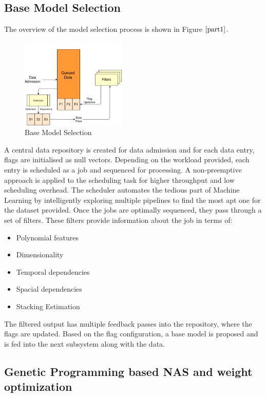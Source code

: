 \documentclass[conference]{IEEEtran}
\begin{document}
\subsection{\textbf{Base Model Selection}}
The overview of the model selection process is shown in Figure $\ref{part1}$.
\begin{figure}[!b]
\centerline{\includegraphics[width=50mm]{part1.png}}
\caption{Base Model Selection}
\label{part1}
\end{figure}

A central data repository is created for data admission and for each data entry, flags are initialised as null vectors. Depending on the workload provided, each entry is scheduled as a job and sequenced for processing. A non-preemptive approach is applied to the scheduling task for higher throughput and low scheduling overhead. The scheduler automates the tedious part of Machine Learning by intelligently exploring multiple pipelines to find the most apt one for the dataset provided. Once the jobs are optimally sequenced, they pass through a set of filters. These filters provide information about the job in terms of:

\begin{itemize}
\item Polynomial features
\item Dimensionality
\item Temporal dependencies
\item Spacial dependencies
\item Stacking Estimation
\end{itemize}

The filtered output has multiple feedback passes into the repository, where the flags are updated. Based on the flag configuration, a base model is proposed and is fed into the next subsystem along with the data. 

\subsection{\textbf{Genetic Programming based NAS and weight optimization}}
\end{document}
